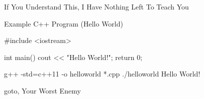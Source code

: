 \documentclass[../lecture1-introduction.tex]{subfiles}
\begin{document}
\begin{frame}[fragile]{If You Understand This, I Have Nothing Left To Teach You}
    \begin{center}
    \end{center}
\end{frame}


\begin{frame}[fragile]{Example C++ Program (Hello World)}
    \begin{cppcode}[]
#include <iostream>

int main()
{
    cout << "Hello World!";
    return 0;
}
    \end{cppcode}

    \begin{commandshell}
g++ -std=c++11 -o helloworld *.cpp
./helloworld
Hello World!
    \end{commandshell}
\end{frame}


\begin{frame}[fragile]{goto, Your Worst Enemy}
    \begin{center}
    \end{center}
\end{frame}

\end{document}

